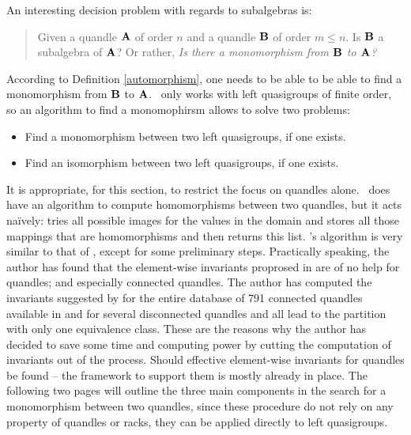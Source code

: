 \newpage\noindent An interesting decision problem with regards to subalgebras is: 
\begin{quote}
    Given a quandle $\mathbf{A}$ of order $n$ and a quandle $\mathbf{B}$ of order $m\leq n$. \newline Is $\mathbf{B}$ a subalgebra of $\mathbf{A}$? Or rather, \emph{Is there a monomorphism from $\mathbf{B}$ to $\mathbf{A}$?}
\end{quote}
\label{monomorphismAlgo}
According to Definition \ref{automorphism}, one needs to be able to be able to find a monomorphism from $\mathbf{B}$ to $\mathbf{A}$. \Software~only works with left quasigroups of finite order, so an algorithm to find a monomophirsm allows to solve two problems:
\begin{itemize}
    \item Find a monomorphism between two left quasigroups, if one exists.
    \item Find an isomorphism between two left quasigroups, if one exists. 
\end{itemize}
It is appropriate, for this section, to restrict the focus on quandles alone.\newline
\rig~does have an algorithm to compute homomorphisms between two quandles, but it acts naïvely: tries all possible images for the values in the domain and stores all those mappings that are homomorphisms and then returns this list.\newline\newline
\Software's algorithm is very similar to that of \cream, except for some preliminary steps.
Practically speaking, the author has found that the element-wise invariants proprosed in \cite{Araujo2022CREAMAP} are of no help for quandles; and especially connected quandles. The author has computed the invariants suggested by \cite{Araujo2022CREAMAP} for the entire database of 791 connected quandles available in \cite{RiGapVendramin} and for several disconnected quandles and all lead to the partition with only one equivalence class. These are the reasons why the author has decided to save some time and computing power by cutting the computation of invariants out of the process. \newline Should effective element-wise invariants for quandles be found -- the framework to support them is mostly already in place. The following two pages will outline the three main components in the search for a monomorphism between two quandles, since these procedure do not rely on any property of quandles or racks, they can be applied directly to left quasigroups.\newline\newline

